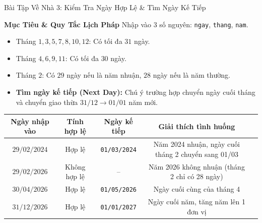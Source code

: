 \documentclass[aspectratio=169, 10pt]{beamer}
\begin{document}
\begin{frame}{Bài Tập Về Nhà 3: Kiểm Tra Ngày Hợp Lệ \& Tìm Ngày Kế Tiếp}
  \begin{block}{\textbf{Mục Tiêu \& Quy Tắc Lịch Pháp}}
    Nhập vào 3 số nguyên: \texttt{ngay}, \texttt{thang}, \texttt{nam}.
    \begin{itemize}
      \item Tháng $1, 3, 5, 7, 8, 10, 12$: Có tối đa $31$ ngày.
      \item Tháng $4, 6, 9, 11$: Có tối đa $30$ ngày.
      \item Tháng $2$: Có $29$ ngày nếu là năm nhuận, $28$ ngày nếu là năm thường.
      \item \textbf{Tìm ngày kế tiếp (Next Day):} Chú ý trường hợp chuyển ngày cuối tháng và chuyển giao thừa $31/12 \to 01/01$ năm mới.
    \end{itemize}
  \end{block}
  \begin{table}[h]
    \centering
    \scriptsize
    \begin{tabularx}{\textwidth}{ccccX}
      \toprule
      \textbf{Ngày nhập vào} & \textbf{Tính hợp lệ} & \textbf{Ngày kế tiếp} & \textbf{Giải thích tình huống} \\
      \midrule
      $29/02/2024$ & Hợp lệ & \texttt{01/03/2024} & Năm 2024 nhuận, ngày cuối tháng 2 chuyển sang 01/03 \\
      \addlinespace
      $29/02/2026$ & Không hợp lệ & -- & Năm 2026 không nhuận (tháng 2 chỉ có 28 ngày) \\
      \addlinespace
      $30/04/2026$ & Hợp lệ & \texttt{01/05/2026} & Ngày cuối cùng của tháng 4 \\
      \addlinespace
      $31/12/2026$ & Hợp lệ & \texttt{01/01/2027} & Ngày cuối năm, tăng năm lên 1 đơn vị \\
      \bottomrule
    \end{tabularx}
  \end{table}
\end{frame}
\end{document}
